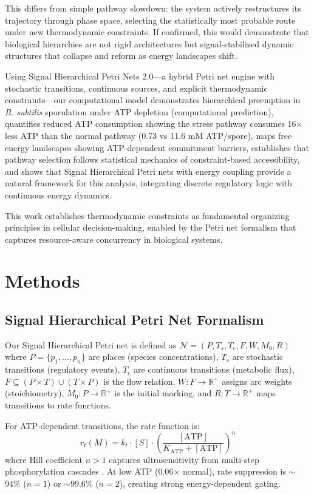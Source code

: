 \documentclass[twocolumn,11pt]{article}
\begin{document}
This differs from simple pathway slowdown: the system actively restructures its trajectory through phase space, selecting the statistically most probable route under new thermodynamic constraints. If confirmed, this would demonstrate that biological hierarchies are not rigid architectures but signal-stabilized dynamic structures that collapse and reform as energy landscapes shift.

Using Signal Hierarchical Petri Nets 2.0—a hybrid Petri net engine with stochastic transitions, continuous sources, and explicit thermodynamic constraints—our computational model demonstrates hierarchical preemption in \textit{B. subtilis} sporulation under ATP depletion (computational prediction), quantifies reduced ATP consumption showing the stress pathway consumes 16× less ATP than the normal pathway (0.73 vs 11.6 mM ATP/spore), maps free energy landscapes showing ATP-dependent commitment barriers, establishes that pathway selection follows statistical mechanics of constraint-based accessibility, and shows that Signal Hierarchical Petri nets with energy coupling provide a natural framework for this analysis, integrating discrete regulatory logic with continuous energy dynamics.

This work establishes thermodynamic constraints as fundamental organizing principles in cellular decision-making, enabled by the Petri net formalism that captures resource-aware concurrency in biological systems.

\section{Methods}

\subsection{Signal Hierarchical Petri Net Formalism}

Our Signal Hierarchical Petri net is defined as $\mathcal{N} = (P, T_s, T_c, F, W, M_0, R)$ where $P = \{p_1, \ldots, p_n\}$ are places (species concentrations), $T_s$ are stochastic transitions (regulatory events), $T_c$ are continuous transitions (metabolic flux), $F \subseteq (P \times T) \cup (T \times P)$ is the flow relation, $W: F \to \mathbb{R}^+$ assigns arc weights (stoichiometry), $M_0: P \to \mathbb{R}^+$ is the initial marking, and $R: T \to \mathbb{R}^+$ maps transitions to rate functions.

For ATP-dependent transitions, the rate function is:
\begin{equation}
    r_t(M) = k_t \cdot [S] \cdot \left(\frac{[\text{ATP}]}{K_{\text{ATP}} + [\text{ATP}]}\right)^{n}
\end{equation}
where Hill coefficient $n > 1$ captures ultrasensitivity from multi-step phosphorylation cascades \citep{ferrell1996,bischofs2009}. At low ATP (0.06× normal), rate suppression is $\sim$94\% ($n=1$) or $\sim$99.6\% ($n=2$), creating strong energy-dependent gating.
\end{document}
